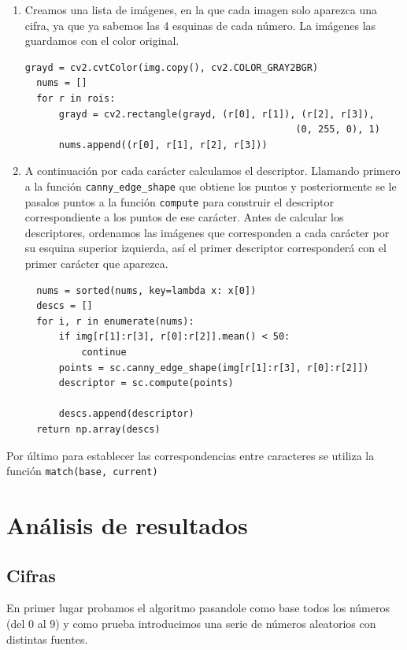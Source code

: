 \documentclass[size=a4, parskip=half, titlepage=false, toc=flat, toc=bib, 12pt]{scrartcl}
\begin{document}
\begin{enumerate}
\item Creamos una lista de imágenes, en la que cada imagen solo aparezca una cifra, ya que ya sabemos las 4 esquinas de cada número. La imágenes las guardamos con el color original.

\begin{verbatim}
grayd = cv2.cvtColor(img.copy(), cv2.COLOR_GRAY2BGR)
  nums = []
  for r in rois:
      grayd = cv2.rectangle(grayd, (r[0], r[1]), (r[2], r[3]),
                                                (0, 255, 0), 1)
      nums.append((r[0], r[1], r[2], r[3]))
\end{verbatim}

\item A continuación por cada carácter calculamos el descriptor. Llamando primero a la función \verb|canny_edge_shape| que obtiene los puntos y posteriormente se le pasalos puntos a la función \verb|compute| para construir el descriptor correspondiente a los puntos de ese carácter. Antes de calcular los descriptores, ordenamos las imágenes que corresponden a cada carácter por su esquina superior izquierda, así el primer descriptor corresponderá con el primer carácter que aparezca.

\begin{verbatim}
  nums = sorted(nums, key=lambda x: x[0])
  descs = []
  for i, r in enumerate(nums):
      if img[r[1]:r[3], r[0]:r[2]].mean() < 50:
          continue
      points = sc.canny_edge_shape(img[r[1]:r[3], r[0]:r[2]])
      descriptor = sc.compute(points)

      descs.append(descriptor)
  return np.array(descs)
\end{verbatim}

\end{enumerate}
Por último para establecer las correspondencias entre caracteres se utiliza la función \verb|match(base, current)|

\section{Análisis de resultados}

\subsection{Cifras}%
\label{sub:cifras}

En primer lugar probamos el algoritmo pasandole como base todos los números (del 0 al 9) y como prueba introducimos una serie de números aleatorios con distintas fuentes.
\end{document}
